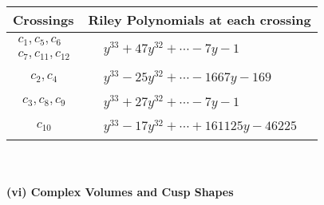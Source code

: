 \documentclass[1p]{elsarticle_modified}
\theoremstyle{definition}
\begin{document}
\begin{tabular}{m{50pt}|m{274pt}}
Crossings & \hspace{64pt}Riley Polynomials at each crossing \\
\hline $$\begin{aligned}c_{1},c_{5},c_{6}\\c_{7},c_{11},c_{12}\end{aligned}$$&$\begin{aligned}
&y^{33}+47 y^{32}+\cdots-7 y-1
\end{aligned}$\\
\hline $$\begin{aligned}c_{2},c_{4}\end{aligned}$$&$\begin{aligned}
&y^{33}-25 y^{32}+\cdots-1667 y-169
\end{aligned}$\\
\hline $$\begin{aligned}c_{3},c_{8},c_{9}\end{aligned}$$&$\begin{aligned}
&y^{33}+27 y^{32}+\cdots-7 y-1
\end{aligned}$\\
\hline $$\begin{aligned}c_{10}\end{aligned}$$&$\begin{aligned}
&y^{33}-17 y^{32}+\cdots+161125 y-46225
\end{aligned}$\\
\hline
\end{tabular}\\~\\
\newpage\flushleft \textbf{(vi) Complex Volumes and Cusp Shapes}
\end{document}
